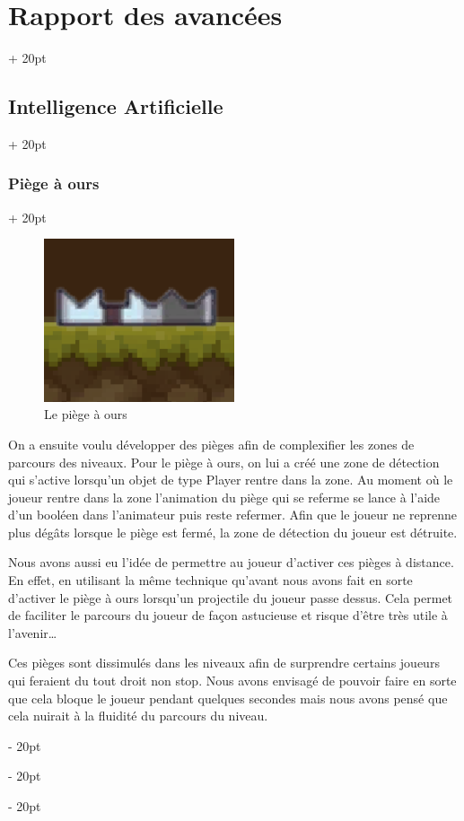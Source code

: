 \documentclass[a4paper, 12pt, twoside]{article}
\newcommand{\ind}[1][20pt]{\advance\leftskip + #1}
\newcommand{\deind}[1][20pt]{\advance\leftskip - #1}
\newenvironment{indt}[2][20pt]{#2 \par \ind[#1]}{\par \deind} %
\begin{document}
\begin{indt}{\section{Rapport des avancées}}
\begin{indt}{\subsection{Intelligence Artificielle}}
            \begin{indt}{\subsubsection{Piège à ours}}
                \begin{figure}[h]
                    \centering
                    \includegraphics[width=0.5\textwidth]{piege_a_ours.png}
                    \caption{Le piège à ours}
                    \label{fig:mesh1}
                \end{figure}

                On a ensuite voulu développer des pièges afin de complexifier les zones de parcours des niveaux. Pour le piège à ours, on lui a créé une zone de détection qui s’active lorsqu’un objet de type Player rentre dans la zone.  Au moment où le joueur rentre dans la zone l’animation du piège qui se referme se lance à l’aide d’un booléen dans l’animateur puis reste refermer. Afin que le joueur ne reprenne plus dégâts lorsque le piège est fermé, la zone de détection du joueur est détruite.

                Nous avons aussi eu l’idée de permettre au joueur d’activer ces pièges à distance. En effet, en utilisant la même technique qu’avant nous avons fait en sorte d'activer le piège à ours lorsqu’un projectile du joueur passe dessus. Cela permet de faciliter le parcours du joueur de façon astucieuse et risque d’être très utile à l’avenir…

                Ces pièges sont dissimulés dans les niveaux afin de surprendre certains joueurs qui feraient du tout droit non stop. Nous avons envisagé de pouvoir faire en sorte que cela bloque le joueur pendant quelques secondes mais nous avons pensé que cela nuirait à la fluidité du parcours du niveau.
            \end{indt}


\end{indt}
\end{indt}
\end{document}
